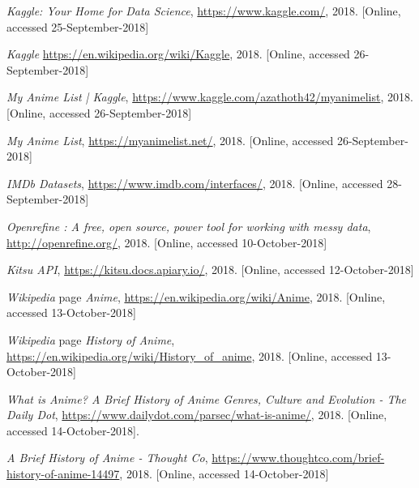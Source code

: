 \documentclass[twocolumn,twoside,11pt,a4paper]{article}
\begin{document}
  \begin{thebibliography}{1}

   \textit{Kaggle: Your Home for Data Science}, \url{ https://www.kaggle.com/}, 2018. [Online, accessed 25-September-2018]
 
   \textit{Kaggle} \url{ https://en.wikipedia.org/wiki/Kaggle}, 2018. [Online, accessed 26-September-2018]

   \textit{My Anime List | Kaggle}, \url{https://www.kaggle.com/azathoth42/myanimelist}, 2018. [Online, accessed 26-September-2018]  

   \textit{My Anime List}, \url{https://myanimelist.net/}, 2018. [Online, accessed 26-September-2018]

   \textit{IMDb Datasets}, \url{ https://www.imdb.com/interfaces/}, 2018. [Online, accessed 28-September-2018]

   \textit{Openrefine : A free, open source, power tool for working with messy data}, \url{http://openrefine.org/}, 2018. [Online, accessed 10-October-2018]

   \textit{Kitsu API}, \url{https://kitsu.docs.apiary.io/}, 2018. [Online, accessed 12-October-2018]

   \textit{Wikipedia} page \textit{Anime}, \url{ https://en.wikipedia.org/wiki/Anime}, 2018. [Online, accessed 13-October-2018]

   \textit{Wikipedia} page \textit{History of Anime}, \url{ https://en.wikipedia.org/wiki/History_of_anime}, 2018. [Online, accessed 13-October-2018]

   \textit{What is Anime? A Brief History of Anime Genres, Culture and Evolution - The Daily Dot}, \url{https://www.dailydot.com/parsec/what-is-anime/},   2018. [Online, accessed 14-October-2018].

   \textit{A Brief History of Anime - Thought Co}, \url{ https://www.thoughtco.com/brief-history-of-anime-14497},   2018. [Online, accessed 14-October-2018]

  \end{thebibliography}
\end{document}
